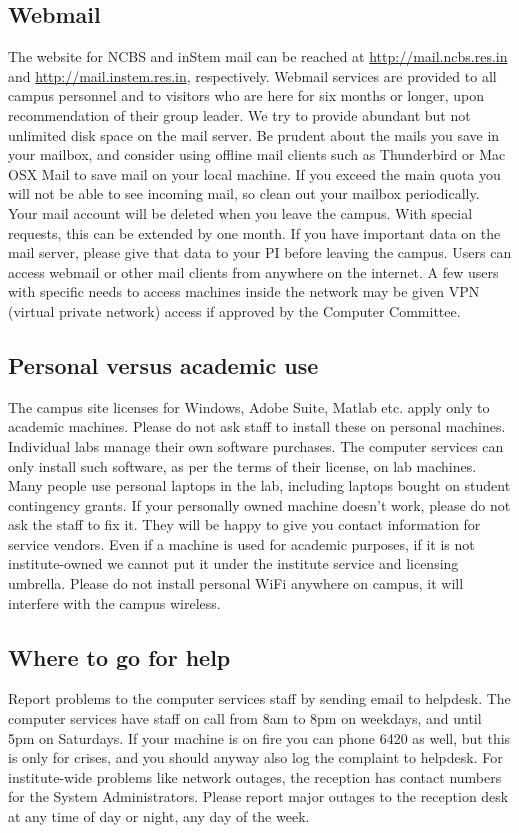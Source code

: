\documentclass[a4paper]{extarticle}
\begin{document}
\subsection{Webmail}

The website for NCBS and inStem mail can be reached at \url{http://mail.ncbs.res.in}
and \url{http://mail.instem.res.in}, respectively. Webmail services are provided to
all campus personnel and to visitors who are here for six months or longer, upon
recommendation of their group leader. We try to provide abundant but not
unlimited disk space on the mail server. Be prudent about the mails you save in
your mailbox, and consider using offline mail clients such as Thunderbird or Mac
OSX Mail to save mail on your local machine. If you exceed the main quota you
will not be able to see incoming mail, so clean out your mailbox periodically.
Your mail account will be deleted when you leave the campus. With special
requests, this can be extended by one month. If you have important data on the
mail server, please give that data to your PI before leaving the campus. Users
can access webmail or other mail clients from anywhere on the internet. A few
users with specific needs to access machines inside the network may be given VPN
(virtual private network) access if approved by the Computer Committee.


\subsection{Personal versus academic use}
The campus site licenses for Windows, Adobe Suite,
Matlab etc. apply only to academic machines. Please do not ask staff to install these on
personal machines. Individual labs manage their own software purchases. The computer
services can only install such software, as per the terms of their license, on lab machines.
Many people use personal laptops in the lab, including laptops bought on student
contingency grants. If your personally owned machine doesn’t work, please do not ask the
staff to fix it. They will be happy to give you contact information for service vendors. Even
if a machine is used for academic purposes, if it is not institute-owned we cannot put it
under the institute service and licensing umbrella. Please do not install personal WiFi
anywhere on campus, it will interfere with the campus wireless.

\subsection{Where to go for help}
Report problems to the computer services staff by sending email to
helpdesk. The computer services have staff on call from 8am to 8pm on weekdays, and until
5pm on Saturdays. If your machine is on fire you can phone 6420 as well, but this is only for
crises, and you should anyway also log the complaint to helpdesk. For institute-wide
problems like network outages, the reception has contact numbers for the System
Administrators. Please report major outages to the reception desk at any time of day or
night, any day of the week.
\end{document}
